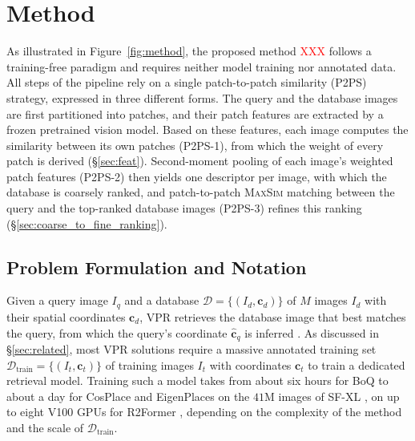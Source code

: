 \section{Method}
\label{sec:method}
As illustrated in Figure~\ref{fig:method}, the proposed method \textcolor{red}{XXX} follows a training-free paradigm and requires neither model training nor annotated data. All steps of the pipeline rely on a single patch-to-patch similarity (P2PS) strategy, expressed in three different forms. The query and the database images are first partitioned into patches, and their patch features are extracted by a frozen pretrained vision model. Based on these features, each image computes the similarity between its own patches (P2PS-1), from which the weight of every patch is derived (\S\ref{sec:feat}). Second-moment pooling of each image's weighted patch features (P2PS-2) then yields one descriptor per image, with which the database is coarsely ranked, and patch-to-patch \textsc{MaxSim} matching \citep{chamfer} between the query and the top-ranked database images (P2PS-3) refines this ranking (\S\ref{sec:coarse_to_fine_ranking}).
\subsection{Problem Formulation and Notation}  %
\label{sec:prelim}
Given a query image $I_q$ and a database $\mathcal{D}=\{(I_d,\mathbf c_d)\}$ of $M$ images $I_d$ with their spatial coordinates $\mathbf c_d$, VPR retrieves the database image that best matches the query, from which the query's coordinate $\hat{\mathbf c}_q$ is inferred \citep{netvlad}. As discussed in \S\ref{sec:related}, most VPR solutions require a massive annotated training set $\mathcal{D}_{\mathrm{train}}=\{(I_t,\mathbf c_t)\}$ of training images $I_t$ with coordinates $\mathbf c_t$ to train a dedicated retrieval model. Training such a model takes from about six hours for BoQ \citep{boq} to about a day for CosPlace and EigenPlaces on the $41$M images of SF-XL \citep{cosplace,eigenplaces}, on up to eight V100 GPUs for R2Former \citep{r2former}, depending on the complexity of the method and the scale of $\mathcal{D}_{\mathrm{train}}$.

